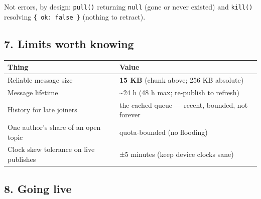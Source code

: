 \documentclass[
  nobib]{tufte-handout}
\newcounter{none} %
\begin{document}
Not errors, by design: \texttt{pull()} returning \texttt{null} (gone or
never existed) and \texttt{kill()} resolving \texttt{\{\ ok:\ false\ \}}
(nothing to retract).

\subsection{7. Limits worth knowing}\label{limits-worth-knowing}

{\def\LTcaptype{none} %
\begin{longtable}[]{@{}
  >{\raggedright\arraybackslash}p{}
  >{\raggedright\arraybackslash}p{}@{}}
\toprule\noalign{}
\begin{minipage}[b]{\linewidth}\raggedright
Thing
\end{minipage} & \begin{minipage}[b]{\linewidth}\raggedright
Value
\end{minipage} \\
\midrule\noalign{}
\endhead
\bottomrule\noalign{}
\endlastfoot
Reliable message size & \textbf{15 KB} (chunk above; 256 KB absolute) \\
Message lifetime & \textasciitilde24 h (48 h max; re-publish to
refresh) \\
History for late joiners & the cached queue --- recent, bounded, not
forever \\
One author's share of an open topic & quota-bounded (no flooding) \\
Clock skew tolerance on live publishes & ±5 minutes (keep device clocks
sane) \\
\end{longtable}
}

\subsection{8. Going live}\label{going-live}
\end{document}

